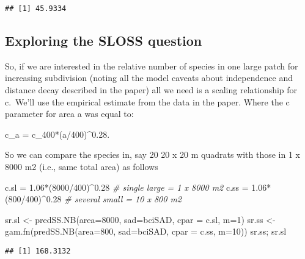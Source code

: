 \documentclass[
]{article}
\newenvironment{Shaded}{\begin{snugshade}}{\end{snugshade}}
\newcommand{\AttributeTok}[1]{\textcolor[rgb]{0.77,0.63,0.00}{#1}}
\newcommand{\CommentTok}[1]{\textcolor[rgb]{0.56,0.35,0.01}{\textit{#1}}}
\newcommand{\DecValTok}[1]{\textcolor[rgb]{0.00,0.00,0.81}{#1}}
\newcommand{\FloatTok}[1]{\textcolor[rgb]{0.00,0.00,0.81}{#1}}
\newcommand{\FunctionTok}[1]{\textcolor[rgb]{0.00,0.00,0.00}{#1}}
\newcommand{\NormalTok}[1]{#1}
\newcommand{\OtherTok}[1]{\textcolor[rgb]{0.56,0.35,0.01}{#1}}
\newcommand{\SpecialCharTok}[1]{\textcolor[rgb]{0.00,0.00,0.00}{#1}}
\begin{document}
\begin{verbatim}
## [1] 45.9334
\end{verbatim}

\hypertarget{exploring-the-sloss-question}{%
\subsection{Exploring the SLOSS
question}\label{exploring-the-sloss-question}}

So, if we are interested in the relative number of species in one large
patch for increasing subdivision (noting all the model caveats about
independence and distance decay described in the paper) all we need is a
scaling relationship for c.~We'll use the empirical estimate from the
data in the paper. Where the c parameter for area a was equal to:

c\_a = c\_400*(a/400)\^{}0.28.

So we can compare the species in, say 20 20 x 20 m quadrats with those
in 1 x 8000 m2 (i.e., same total area) as follows

\begin{Shaded}
\begin{Highlighting}[]
\NormalTok{c.sl }\OtherTok{=} \FloatTok{1.06}\SpecialCharTok{*}\NormalTok{(}\DecValTok{8000}\SpecialCharTok{/}\DecValTok{400}\NormalTok{)}\SpecialCharTok{\^{}}\FloatTok{0.28}  \CommentTok{\# single large = 1 x 8000 m2}
\NormalTok{c.ss }\OtherTok{=} \FloatTok{1.06}\SpecialCharTok{*}\NormalTok{(}\DecValTok{800}\SpecialCharTok{/}\DecValTok{400}\NormalTok{)}\SpecialCharTok{\^{}}\FloatTok{0.28}  \CommentTok{\# several small = 10 x 800 m2}

\NormalTok{sr.sl }\OtherTok{\textless{}{-}} \FunctionTok{predSS.NB}\NormalTok{(}\AttributeTok{area=}\DecValTok{8000}\NormalTok{, }\AttributeTok{sad=}\NormalTok{bciSAD, }\AttributeTok{cpar =}\NormalTok{ c.sl, }\AttributeTok{m=}\DecValTok{1}\NormalTok{)}
\NormalTok{sr.ss }\OtherTok{\textless{}{-}} \FunctionTok{gam.fn}\NormalTok{(}\FunctionTok{predSS.NB}\NormalTok{(}\AttributeTok{area=}\DecValTok{800}\NormalTok{, }\AttributeTok{sad=}\NormalTok{bciSAD, }\AttributeTok{cpar =}\NormalTok{ c.ss, }\AttributeTok{m=}\DecValTok{10}\NormalTok{))}
\NormalTok{sr.ss; sr.sl}
\end{Highlighting}
\end{Shaded}

\begin{verbatim}
## [1] 168.3132
\end{verbatim}
\end{document}

